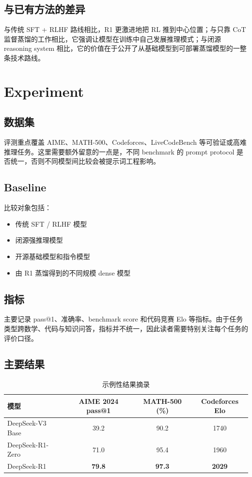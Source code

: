 \documentclass[UTF8,fontset=fandol,zihao=-4]{ctexart}
\begin{document}
\subsection{与已有方法的差异}
与传统 SFT + RLHF 路线相比，R1 更激进地把 RL 推到中心位置；与只靠 CoT 监督蒸馏的工作相比，它强调让模型在训练中自己发展推理模式；与闭源 reasoning system 相比，它的价值在于公开了从基础模型到可部署蒸馏模型的一整条技术路线。

\section{Experiment}

\subsection{数据集}
评测重点覆盖 AIME、MATH-500、Codeforces、LiveCodeBench 等可验证或高难推理任务。这里需要额外留意的一点是，不同 benchmark 的 prompt protocol 是否统一，否则不同模型间比较会被提示词工程影响。

\subsection{Baseline}
比较对象包括：
\begin{itemize}
  \item 传统 SFT / RLHF 模型
  \item 闭源强推理模型
  \item 开源基础模型和指令模型
  \item 由 R1 蒸馏得到的不同规模 dense 模型
\end{itemize}

\subsection{指标}
主要记录 pass@1、准确率、benchmark score 和代码竞赛 Elo 等指标。由于任务类型跨数学、代码与知识问答，指标并不统一，因此读者需要特别关注每个任务的评价口径。

\subsection{主要结果}
\begin{table}[H]
\centering
\caption{示例性结果摘录}
\begin{tabular}{lccc}
\toprule
模型 & AIME 2024 pass@1 & MATH-500 (\%) & Codeforces Elo \\
\midrule
DeepSeek-V3 Base & 39.2 & 90.2 & 1740 \\
DeepSeek-R1-Zero & 71.0 & 95.4 & 1960 \\
DeepSeek-R1 & \textbf{79.8} & \textbf{97.3} & \textbf{2029} \\
\bottomrule
\end{tabular}
\end{table}
\end{document}
